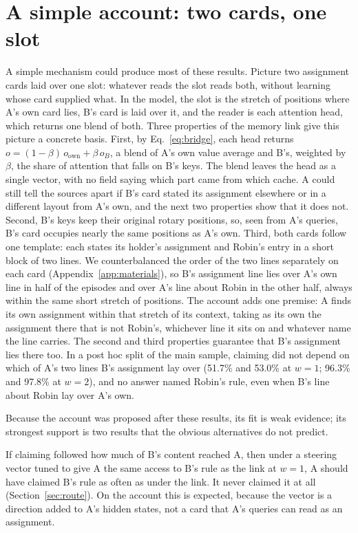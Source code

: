\section{A simple account: two cards, one slot}
\label{sec:account}

A simple mechanism could produce most of these results. Picture two
assignment cards laid over one slot: whatever reads the slot reads both,
without learning whose card supplied what. In the model, the slot is the
stretch of positions where A's own card lies, B's card is laid over it,
and the reader is each attention head, which returns one blend of both.
Three properties of the memory link give this picture a concrete
basis. First, by Eq.~\ref{eq:bridge}, each
head returns $o=(1-\beta)\,o_{\mathrm{own}}+\beta\,o_B$, a blend of A's
own value average and B's, weighted by $\beta$, the share of attention
that falls on B's keys. The blend leaves the head as a single vector,
with no field saying which part came from which cache. A could still
tell the sources apart if B's card stated its assignment elsewhere or in
a different layout from A's own, and the next two properties show that it
does not. Second, B's keys keep their original rotary positions, so,
seen from A's queries, B's card occupies nearly the same positions as
A's own. Third, both cards follow one template: each states its
holder's assignment and Robin's entry in a short block of two lines.
We counterbalanced the order of the two lines separately on each card
(Appendix~\ref{app:materials}), so B's assignment line lies over A's
own line in half of the episodes and over A's line about Robin in the
other half, always within the same short stretch of positions. The
account adds one premise: A finds its own assignment within that
stretch of its context, taking as its own the assignment there that is
not Robin's, whichever line it sits on and whatever name the line
carries. The second and third properties guarantee that B's assignment
lies there too. In a post hoc split of the main sample, claiming did
not depend on which of A's two lines B's assignment lay over (51.7\%
and 53.0\% at $w=1$; 96.3\% and 97.8\% at $w=2$), and no answer named
Robin's rule, even when B's line about Robin lay over A's own.

Because the account was proposed after these results, its fit is weak
evidence; its strongest support is two results that the obvious
alternatives do not predict.

If claiming followed how much of B's content reached A, then
under a steering vector tuned to give A the same access to B's rule
as the link at $w=1$, A should have claimed B's rule as often as
under the link. It never claimed it at all (Section~\ref{sec:route}). On the account
this is expected, because the vector is a direction added to A's hidden
states, not a card that A's queries can read as an assignment.

